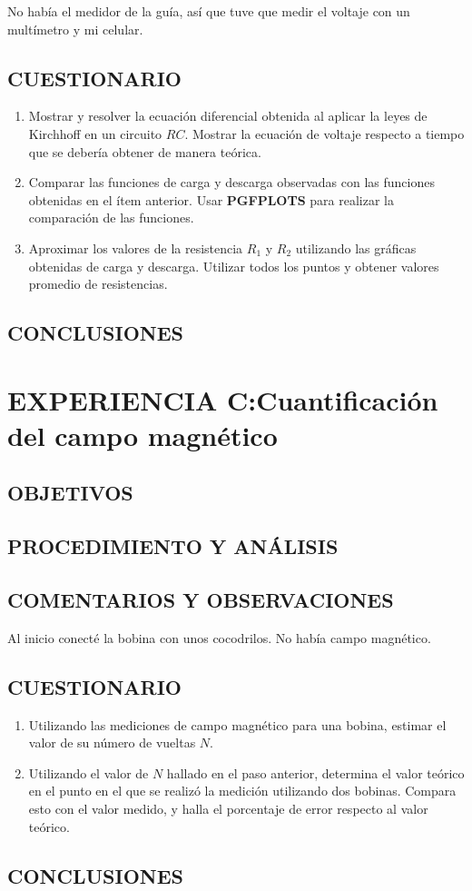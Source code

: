 \documentclass[10pt, twoside]{article}
\begin{document}
No había el medidor de la guía, así que tuve que medir el voltaje con un
multímetro y mi celular.

\subsection{CUESTIONARIO}%
\begin{enumerate}[label=\roman*]
	\item Mostrar y resolver la ecuación diferencial obtenida al aplicar la
		leyes de Kirchhoff en un circuito $RC$.
		Mostrar la ecuación de voltaje respecto a tiempo que se debería
		obtener de manera teórica.
	\item Comparar las funciones de carga y descarga observadas con las
		funciones obtenidas en el ítem anterior.
		Usar \textbf{PGFPLOTS} para realizar la comparación de las funciones.
	\item Aproximar los valores de la resistencia $R_1$ y $R_2$ utilizando
		las gráficas obtenidas de carga y descarga.
		Utilizar todos los puntos y obtener valores promedio de resistencias.
\end{enumerate}

\subsection{CONCLUSIONES}%

\section{EXPERIENCIA C:Cuantificación del campo magnético}%

\subsection{OBJETIVOS}%

\subsection{PROCEDIMIENTO Y ANÁLISIS}%

\subsection{COMENTARIOS Y OBSERVACIONES}%

Al inicio conecté la bobina con unos cocodrilos.
No había campo magnético.

\subsection{CUESTIONARIO}%
\begin{enumerate}[label=\roman*]
	\item Utilizando las mediciones de campo magnético para una bobina,
		estimar el valor de su número de vueltas $N$.
	\item Utilizando el valor de $N$ hallado en el paso anterior,
		determina el valor teórico en el punto en el que se realizó la medición
		utilizando dos bobinas.
		Compara esto con el valor medido,
		y halla el porcentaje de error respecto al valor teórico.
\end{enumerate}

\subsection{CONCLUSIONES}%
\end{document}
